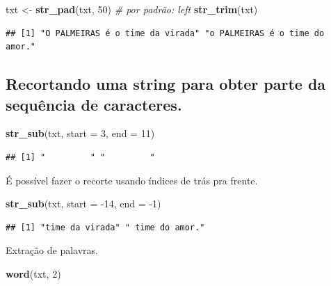 \documentclass[]{book}
\newenvironment{Shaded}{\begin{snugshade}}{\end{snugshade}}
\newcommand{\CommentTok}[1]{\textcolor[rgb]{0.56,0.35,0.01}{\textit{#1}}}
\newcommand{\DataTypeTok}[1]{\textcolor[rgb]{0.13,0.29,0.53}{#1}}
\newcommand{\DecValTok}[1]{\textcolor[rgb]{0.00,0.00,0.81}{#1}}
\newcommand{\KeywordTok}[1]{\textcolor[rgb]{0.13,0.29,0.53}{\textbf{#1}}}
\newcommand{\NormalTok}[1]{#1}
\newcommand{\StringTok}[1]{\textcolor[rgb]{0.31,0.60,0.02}{#1}}
\begin{document}
\begin{Shaded}
\begin{Highlighting}[]
\NormalTok{txt <-}\StringTok{ }\KeywordTok{str_pad}\NormalTok{(txt, }\DecValTok{50}\NormalTok{) }\CommentTok{# por padrão: left}
\KeywordTok{str_trim}\NormalTok{(txt)}
\end{Highlighting}
\end{Shaded}

\begin{verbatim}
## [1] "O PALMEIRAS é o time da virada" "o PALMEIRAS é o time do amor."
\end{verbatim}

\hypertarget{recortando-uma-string-para-obter-parte-da-sequuxeancia-de-caracteres.}{%
\subsection{Recortando uma string para obter parte da sequência de caracteres.}\label{recortando-uma-string-para-obter-parte-da-sequuxeancia-de-caracteres.}}

\begin{Shaded}
\begin{Highlighting}[]
\KeywordTok{str_sub}\NormalTok{(txt, }\DataTypeTok{start =} \DecValTok{3}\NormalTok{, }\DataTypeTok{end =} \DecValTok{11}\NormalTok{)}
\end{Highlighting}
\end{Shaded}

\begin{verbatim}
## [1] "         " "         "
\end{verbatim}

É possível fazer o recorte usando índices de trás pra frente.

\begin{Shaded}
\begin{Highlighting}[]
\KeywordTok{str_sub}\NormalTok{(txt, }\DataTypeTok{start =} \DecValTok{-14}\NormalTok{, }\DataTypeTok{end =} \DecValTok{-1}\NormalTok{)}
\end{Highlighting}
\end{Shaded}

\begin{verbatim}
## [1] "time da virada" " time do amor."
\end{verbatim}

Extração de palavras.

\begin{Shaded}
\begin{Highlighting}[]
\KeywordTok{word}\NormalTok{(txt, }\DecValTok{2}\NormalTok{)}
\end{Highlighting}
\end{Shaded}
\end{document}
